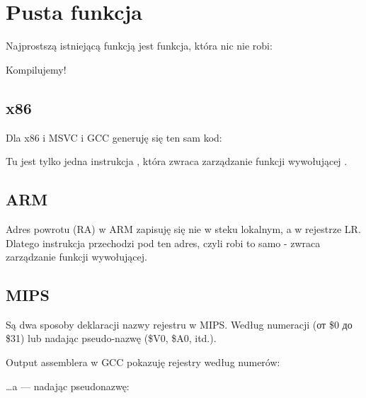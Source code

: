 \section{Pusta funkcja}
\label{empty_func}

Najprostszą istniejącą funkcją jest funkcja, która nic nie robi:



Kompilujemy!

\subsection{x86}

Dla x86 i MSVC i GCC generuję się ten sam kod:



Tu jest tylko jedna instrukcja \RET, która zwraca zarządzanie funkcji wywołującej .

\subsection{ARM}



Adres powrotu (\ac{RA}) w ARM zapisuję się nie w steku lokalnym, a w rejestrze \ac{LR}.
Dlatego instrukcja  przechodzi pod ten adres, czyli robi to samo - zwraca zarządzanie funkcji wywołującej.

\subsection{MIPS}

Są dwa sposoby deklaracji nazwy rejestru w MIPS. Według numeracji (от \$0 до \$31) lub nadając pseudo-nazwę (\$V0, \$A0, itd.).

Output assemblera w GCC pokazuję rejestry według numerów:



\dots a \IDA --- nadając pseudonazwę:



